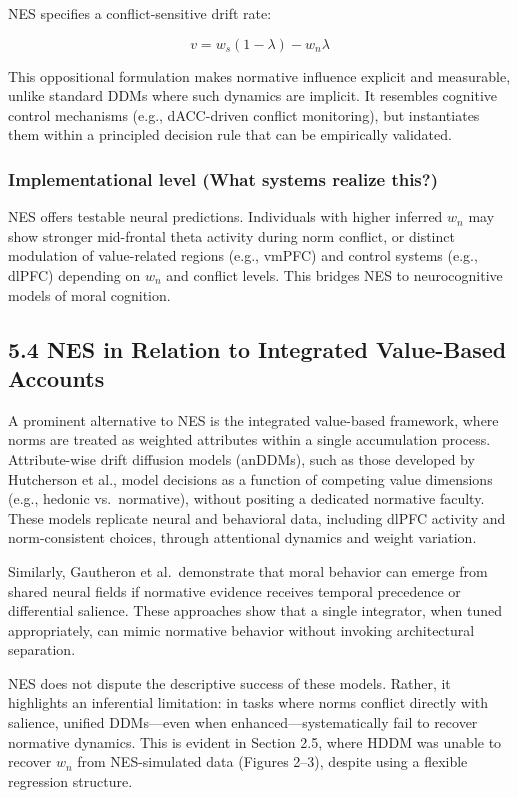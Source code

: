 \documentclass[
  11pt,
]{article}
\begin{document}
NES specifies a conflict-sensitive drift rate:

\[v = w_s(1 - \lambda) - w_n\lambda\]

This oppositional formulation makes normative influence explicit and
measurable, unlike standard DDMs where such dynamics are implicit. It
resembles cognitive control mechanisms (e.g., dACC-driven conflict
monitoring), but instantiates them within a principled decision rule
that can be empirically validated.

\subsubsection{Implementational level (What systems realize
this?)}\label{implementational-level-what-systems-realize-this}

NES offers testable neural predictions. Individuals with higher inferred
\(w_n\) may show stronger mid-frontal theta activity during norm
conflict, or distinct modulation of value-related regions (e.g., vmPFC)
and control systems (e.g., dlPFC) depending on \(w_n\) and conflict
levels. This bridges NES to neurocognitive models of moral cognition.

\subsection{5.4 NES in Relation to Integrated Value-Based
Accounts}\label{nes-in-relation-to-integrated-value-based-accounts}

A prominent alternative to NES is the integrated value-based framework,
where norms are treated as weighted attributes within a single
accumulation process. Attribute-wise drift diffusion models (anDDMs),
such as those developed by Hutcherson et al., model decisions as a
function of competing value dimensions (e.g., hedonic vs.~normative),
without positing a dedicated normative faculty. These models replicate
neural and behavioral data, including dlPFC activity and norm-consistent
choices, through attentional dynamics and weight variation.

Similarly, Gautheron et al.~demonstrate that moral behavior can emerge
from shared neural fields if normative evidence receives temporal
precedence or differential salience. These approaches show that a single
integrator, when tuned appropriately, can mimic normative behavior
without invoking architectural separation.

NES does not dispute the descriptive success of these models. Rather, it
highlights an inferential limitation: in tasks where norms conflict
directly with salience, unified DDMs---even when
enhanced---systematically fail to recover normative dynamics. This is
evident in Section 2.5, where HDDM was unable to recover \(w_n\) from
NES-simulated data (Figures 2--3), despite using a flexible regression
structure.
\end{document}
